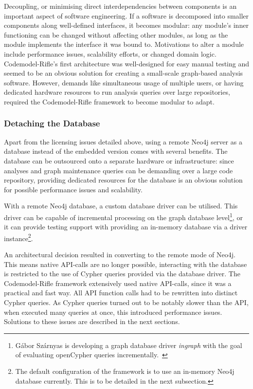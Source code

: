 Decoupling, or minimising direct interdependencies between components is an important aspect of software engineering. If a software is decomposed into smaller components along well-defined interfaces, it becomes modular: any module's inner functioning can be changed without affecting other modules, as long as the module implements the interface it was bound to. Motivations to alter a module include performance issues, scalability efforts, or changed domain logic. Codemodel-Rifle's first architecture was well-designed for easy manual testing and seemed to be an obvious solution for creating a small-scale graph-based analysis software. However, demands like simultaneous usage of multiple users, or having dedicated hardware resources to run analysis queries over large repositories, required the Codemodel-Rifle framework to become modular to adapt.


\subsubsection{Detaching the Database}

Apart from the licensing issues detailed above, using a remote Neo4j server as a database instead of the embedded version comes with several benefits. The database can be outsourced onto a separate hardware or infrastructure: since analyses and graph maintenance queries can be demanding over a large code repository, providing dedicated resources for the database is an obvious solution for possible performance issues and scalability.

With a remote Neo4j database, a custom database driver can be utilised. This driver can be capable of incremental processing on the graph database level\footnote{Gábor Szárnyas is developing a graph database driver \emph{ingraph} with the goal of evaluating openCypher queries incrementally.~\cite{ingraph-github}}, or it can provide testing support with providing an in-memory database via a driver instance\footnote{The default configuration of the framework is to use an in-memory Neo4j database currently. This is to be detailed in the next subsection.}.

An architectural decision resulted in converting to the remote mode of Neo4j. This means native API-calls are no longer possible, interacting with the database is restricted to the use of Cypher queries provided via the database driver. The Codemodel-Rifle framework extensively used native API-calls, since it was a practical and fast way. All API function calls had to be rewritten into distinct Cypher queries. As Cypher queries turned out to be notably slower than the API, when executed many queries at once, this introduced performance issues. Solutions to these issues are described in the next sections.


